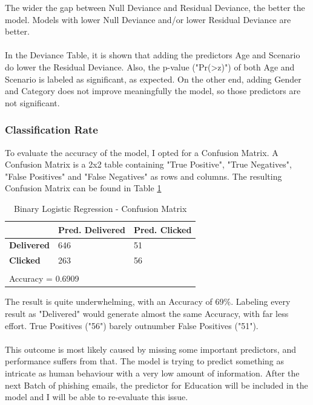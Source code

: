 \documentclass[a4paper]{article}
\begin{document}
\noindent
The wider the gap between Null Deviance and Residual Deviance, the better the model. Models with lower Null Deviance and/or lower Residual Deviance are better.
\\ \\
In the Deviance Table, it is shown that adding the predictors Age and Scenario do lower the Residual Deviance. Also, the p-value ("Pr(\textgreater z)") of both Age and Scenario is labeled as significant, as expected. On the other end, adding Gender and Category does not improve meaningfully the model, so those predictors are not significant.

\subsubsection{Classification Rate}

To evaluate the accuracy of the model, I opted for a Confusion Matrix. A Confusion Matrix is a 2x2 table containing "True Positive", "True Negatives", "False Positives" and "False Negatives" as rows and columns. The resulting Confusion Matrix can be found in Table \ref{tb-cmatrix}

\bigskip

\begingroup
\renewcommand{\arraystretch}{1.25}
\begin{table}[ht]
\begin{center}
    \begin{tabular}{ | l | l | l | }
    \hline
    \textbf{} & \textbf{Pred. Delivered} & \textbf{Pred. Clicked} \\
    \hline
    \textbf{Delivered} & 646 & 51 \\ \hline
    \textbf{Clicked} & 263 & 56 \\ \hline
    
    \multicolumn{3}{l}{} \\ \hline
    \multicolumn{3}{|l|}{Accuracy = 0.6909} \\
    \hline
    \end{tabular}
\end{center}
\caption{Binary Logistic Regression - Confusion Matrix}
\label{tb-cmatrix}
\end{table}

\noindent
The result is quite underwhelming, with an Accuracy of 69\%. Labeling every result as "Delivered" would generate almost the same Accuracy, with far less effort. True Positives ("56") barely outnumber False Positives ("51").
\\ \\
This outcome is most likely caused by missing some important predictors, and performance suffers from that. The model is trying to predict something as intricate as human behaviour with a very low amount of information. After the next Batch of phishing emails, the predictor for Education will be included in the model and I will be able to re-evaluate this issue.
\end{document}
